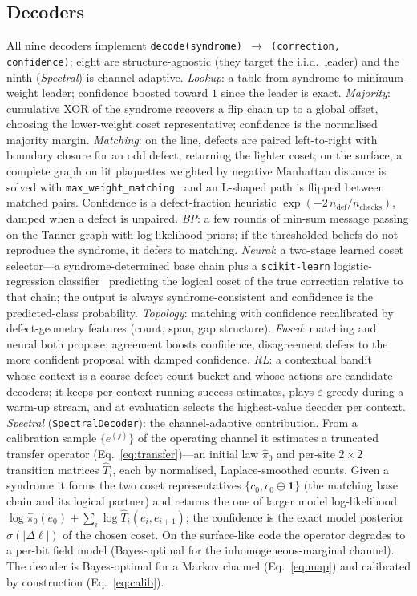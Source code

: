 \documentclass[reprint,aps,prxquantum,amsmath,amssymb,floatfix,nofootinbib,longbibliography]{revtex4-2}
\theoremstyle{definition}
\theoremstyle{remark}
\theoremstyle{plain}
\newcommand{\eps}{\varepsilon}
\begin{document}
\subsection{Decoders}
\label{sec:methods_decoders}
All nine decoders implement \texttt{decode(syndrome)\,$\to$\,(correction, confidence)}; eight are structure-agnostic (they target the i.i.d.\ leader) and the ninth (\emph{Spectral}) is channel-adaptive. \emph{Lookup}: a table from syndrome to minimum-weight leader; confidence boosted toward $1$ since the leader is exact. \emph{Majority}: cumulative XOR of the syndrome recovers a flip chain up to a global offset, choosing the lower-weight coset representative; confidence is the normalised majority margin. \emph{Matching}: on the line, defects are paired left-to-right with boundary closure for an odd defect, returning the lighter coset; on the surface, a complete graph on lit plaquettes weighted by negative Manhattan distance is solved with \texttt{max\_weight\_matching}~\cite{edmonds1965paths,hagberg2008exploring} and an L-shaped path is flipped between matched pairs. Confidence is a defect-fraction heuristic $\exp(-2\,n_{\mathrm{def}}/n_{\mathrm{checks}})$, damped when a defect is unpaired. \emph{BP}: a few rounds of min-sum message passing on the Tanner graph with log-likelihood priors; if the thresholded beliefs do not reproduce the syndrome, it defers to matching. \emph{Neural}: a two-stage learned coset selector---a syndrome-determined base chain plus a \texttt{scikit-learn} logistic-regression classifier~\cite{pedregosa2011scikit} predicting the logical coset of the true correction relative to that chain; the output is always syndrome-consistent and confidence is the predicted-class probability. \emph{Topology}: matching with confidence recalibrated by defect-geometry features (count, span, gap structure). \emph{Fused}: matching and neural both propose; agreement boosts confidence, disagreement defers to the more confident proposal with damped confidence. \emph{RL}: a contextual bandit~\cite{li2010contextual,sutton2018reinforcement} whose context is a coarse defect-count bucket and whose actions are candidate decoders; it keeps per-context running success estimates, plays $\eps$-greedy during a warm-up stream, and at evaluation selects the highest-value decoder per context. \emph{Spectral} (\texttt{SpectralDecoder}): the channel-adaptive contribution. From a calibration sample $\{e^{(j)}\}$ of the operating channel it estimates a truncated transfer operator (Eq.~\eqref{eq:transfer})---an initial law $\hat\pi_0$ and per-site $2\times2$ transition matrices $\hat T_i$, each by normalised, Laplace-smoothed counts. Given a syndrome it forms the two coset representatives $\{c_0,c_0\oplus\mathbf 1\}$ (the matching base chain and its logical partner) and returns the one of larger model log-likelihood $\log\hat\pi_0(e_0)+\sum_i\log\hat T_i(e_i,e_{i+1})$; the confidence is the exact model posterior $\sigma(|\Delta\ell|)$ of the chosen coset. On the surface-like code the operator degrades to a per-bit field model (Bayes-optimal for the inhomogeneous-marginal channel). The decoder is Bayes-optimal for a Markov channel (Eq.~\eqref{eq:map}) and calibrated by construction (Eq.~\eqref{eq:calib}).
\end{document}
